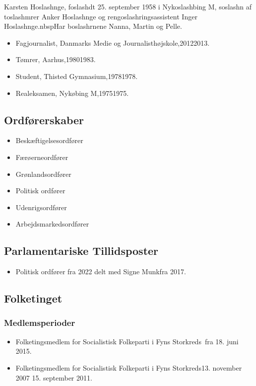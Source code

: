 \documentclass[11pt, a4paper]{awesome-cv}
\begin{document}
\makecvheader[R]
\makelettertitle
\begin{cvletter}
Karsten Hoslashnge, foslashdt 25. september 1958 i Nykoslashbing M, soslashn af toslashmrer Anker Hoslashnge og rengoslashringsassistent Inger Hoslashnge.nbspHar boslashrnene Nanna, Martin og Pelle.

\begin{itemize}
\item Fagjournalist, Danmarks Medie og Journalisthøjskole,20122013.
\item Tømrer, Aarhus,19801983.
\item Student, Thisted Gymnasium,19781978.
\item Realeksamen, Nykøbing M,19751975.
\end{itemize}
\subsection*{Ordførerskaber}
\begin{itemize}
\item Beskæftigelsesordfører
\item Færøerneordfører
\item Grønlandsordfører
\item Politisk ordfører
\item Udenrigsordfører
\item Arbejdsmarkedsordfører
\end{itemize}
\subsection*{Parlamentariske Tillidsposter}
\begin{itemize}
\item Politisk ordfører fra 2022 delt med Signe Munkfra 2017.
\end{itemize}
\subsection*{Folketinget}
\subsubsection*{Medlemsperioder}
\begin{itemize}
\item Folketingsmedlem for Socialistisk Folkeparti i Fyns Storkreds fra 18. juni 2015.
\item Folketingsmedlem for Socialistisk Folkeparti i Fyns Storkreds13. november 2007  15. september 2011.
\end{itemize}

\end{cvletter}
\end{document}
